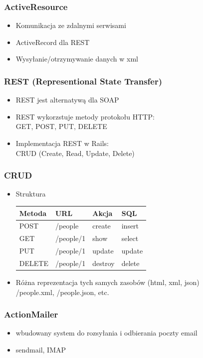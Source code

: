 \documentclass[12t]{beamer}
\begin{document}
\begin{frame}
  \frametitle{ActiveResource}
    \begin{itemize}
      \item Komunikacja ze zdalnymi serwisami
      \item ActiveRecord dla REST
      \item Wysyłanie/otrzymywanie danych w xml
    \end{itemize}
\end{frame}

\begin{frame}
  \frametitle{REST (Representional State Transfer)}
    \begin{itemize}
      \item REST jest alternatywą dla SOAP
      \item REST wykorzstuje metody protokołu HTTP:\\
        GET, POST, PUT, DELETE
      \item Implementacja REST w Rails:\\
        CRUD (Create, Read, Update, Delete)
      \end{itemize}
\end{frame}

\begin{frame}
  \frametitle{CRUD}
  \begin{itemize}
    \item Struktura\\
      \begin{tabular}{l|l|l|l}
        Metoda & URL & Akcja & SQL \\
        \hline
        POST & /people & create & insert \\
        \hline
        GET & /people/1 & show & select\\
        \hline
        PUT & /people/1 & update & update\\
        \hline
        DELETE & /people/1 & destroy & delete\\
      \end{tabular}
    \item Różna reprezentacja tych samych zasobów (html, xml, json)\\
      /people.xml, /people.json, etc.
  \end{itemize}
\end{frame}

\begin{frame}
  \frametitle{ActionMailer}
  \begin{itemize}
  \item wbudowany system do rozsyłania i odbierania poczty email
  \item sendmail, IMAP
  \end{itemize}
\end{frame}
\end{document}
